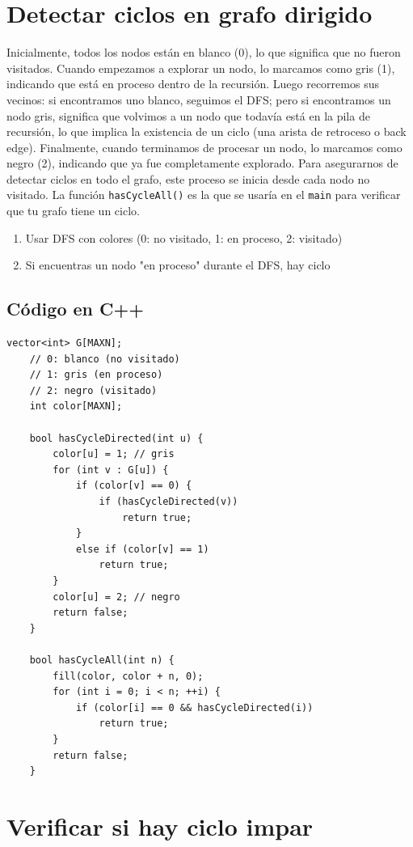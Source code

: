 \section{Detectar ciclos en grafo dirigido}

Inicialmente, todos los nodos están en blanco (0), lo que significa que no fueron visitados. Cuando empezamos a explorar un nodo, lo marcamos como gris (1), indicando que está en proceso dentro de la recursión. Luego recorremos sus vecinos: si encontramos uno blanco, seguimos el DFS; pero si encontramos un nodo gris, significa que volvimos a un nodo que todavía está en la pila de recursión, lo que implica la existencia de un ciclo (una arista de retroceso o back edge). Finalmente, cuando terminamos de procesar un nodo, lo marcamos como negro (2), indicando que ya fue completamente explorado. Para asegurarnos de detectar ciclos en todo el grafo, este proceso se inicia desde cada nodo no visitado. La función \texttt{hasCycleAll()} es la que se usaría en el \texttt{main} para verificar que tu grafo tiene un ciclo.

\begin{enumerate}
	\item Usar DFS con colores (0: no visitado, 1: en proceso, 2: visitado)
	\item Si encuentras un nodo "en proceso" durante el DFS, hay ciclo
\end{enumerate}

\subsection*{Código en C++}

\begin{lstlisting}[caption=Detectar ciclos en grafo dirigido]
	vector<int> G[MAXN];
	// 0: blanco (no visitado)
	// 1: gris (en proceso)
	// 2: negro (visitado)
	int color[MAXN]; 
	
	bool hasCycleDirected(int u) {
		color[u] = 1; // gris
		for (int v : G[u]) {
			if (color[v] == 0) {
				if (hasCycleDirected(v)) 
					return true;
			} 
			else if (color[v] == 1) 
				return true;
		}
		color[u] = 2; // negro
		return false;
	}
	
	bool hasCycleAll(int n) {
		fill(color, color + n, 0);
		for (int i = 0; i < n; ++i) {
			if (color[i] == 0 && hasCycleDirected(i))
				return true;
		}
		return false;
	}
\end{lstlisting}

\section{Verificar si hay ciclo impar}


